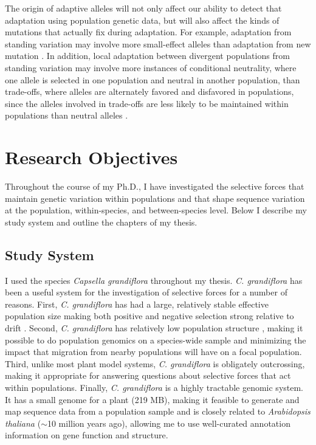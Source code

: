 The origin of adaptive alleles will not only affect our ability to detect that adaptation using population genetic data, but will also affect the kinds of mutations that actually fix during adaptation. For example, adaptation from standing variation may involve more small-effect alleles than adaptation from new mutation \citep{Orr2001-fq}. In addition, local adaptation between divergent populations from standing variation may involve more instances of conditional neutrality, where one allele is selected in one population and neutral in another population, than trade-offs, where alleles are alternately favored and disfavored in populations, since the alleles involved in trade-offs are less likely to be maintained within populations than neutral alleles \citep{Anderson2011-hs}. 

\section{Research Objectives}

Throughout the course of my Ph.D., I have investigated the selective forces that maintain genetic variation within populations and that shape sequence variation at the population, within-species, and between-species level. Below I describe my study system and outline the chapters of my thesis.

\subsection{Study System}
I used the species \textit{Capsella grandiflora} throughout my thesis. \textit{C. grandiflora} has been a useful system for the investigation of selective forces for a number of reasons. First, \textit{C. grandiflora} has had a large, relatively stable effective population size making both positive and negative selection strong relative to drift \citep{Slotte2010-gw}. Second, \textit{C. grandiflora} has relatively low population structure \citep{St_onge2011-jz}, making it possible to do population genomics on a species-wide sample and minimizing the impact that migration from nearby populations will have on a focal population. Third, unlike most plant model systems, \textit{C. grandiflora} is obligately outcrossing, making it appropriate for answering questions about selective forces that act within populations. Finally, \textit{C. grandiflora} is a highly tractable genomic system. It has a small genome for a plant (219 MB), making it feasible to generate and map sequence data from a population sample and is closely related to \textit{Arabidopsis thaliana} ($\sim$10 million years ago), allowing me to use well-curated annotation information on gene function and structure.


